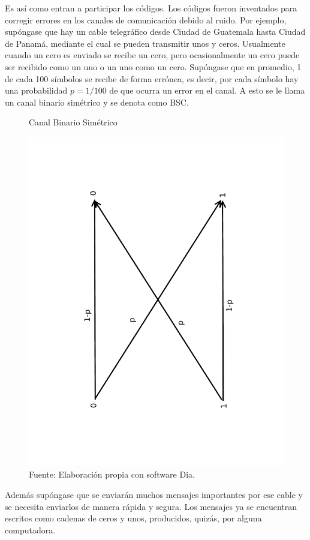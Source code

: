 Es así como entran a participar los códigos. Los códigos fueron inventados para corregir errores en los canales de comunicación debido al ruido. Por ejemplo, supóngase que hay un cable telegráfico desde Ciudad de Guatemala hasta Ciudad de Panamá, mediante el cual se pueden transmitir unos y ceros. Usualmente cuando un cero es enviado se recibe un cero, pero ocasionalmente un cero puede ser recibido como un uno o un uno como un cero. Supóngase que en promedio, 1 de cada 100 símbolos se recibe de forma errónea, es decir, por cada símbolo hay una probabilidad $p=1/100$ de que ocurra un error en el canal. A esto se le llama un canal binario simétrico y se denota como BSC.
\begin{figure}
\centering
\caption{Canal Binario Simétrico}
\includegraphics[angle=-90,width=0.6\linewidth]{CBS.pdf}
\caption*{Fuente: Elaboración propia con software Dia.}
\label{fig:CBS}
\end{figure} 
Además supóngase que se enviarán muchos mensajes importantes por ese cable y se necesita enviarlos de manera rápida y segura. Los mensajes ya se encuentran escritos como cadenas de ceros y unos, producidos, quizás, por alguna computadora.

